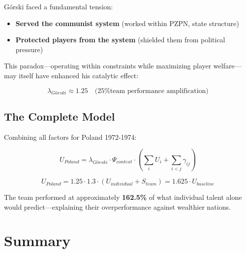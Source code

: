 Górski faced a fundamental tension:

\begin{itemize}
    \item \textbf{Served the communist system} (worked within PZPN, state structure)
    \item \textbf{Protected players from the system} (shielded them from political pressure)
\end{itemize}

This paradox—operating within constraints while maximizing player welfare—
may itself have enhanced his catalytic effect:

\begin{equation}
\lambda_{Górski} \approx 1.25 \quad \text{(25\% team performance amplification)}
\end{equation}

\subsection{The Complete Model}

Combining all factors for Poland 1972-1974:

\begin{equation}
U_{Poland} = \lambda_{Górski} \cdot \Psi_{context} \cdot \left( \sum_{i} U_i + \sum_{i<j} \gamma_{ij} \right)
\end{equation}

\begin{equation}
U_{Poland} = 1.25 \cdot 1.3 \cdot (U_{individual} + S_{team}) = 1.625 \cdot U_{baseline}
\end{equation}

The team performed at approximately \textbf{162.5\%} of what individual talent
alone would predict—explaining their overperformance against wealthier nations.



\section*{Summary}

